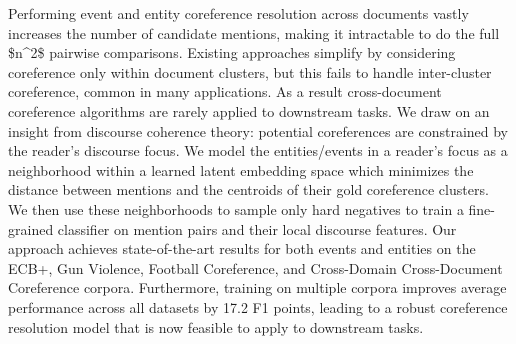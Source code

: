 Performing event and entity coreference resolution across documents vastly increases the number of candidate mentions, making it intractable to do the full \$n^2\$ pairwise comparisons. Existing approaches simplify by considering coreference only within document clusters, but this fails to handle inter-cluster coreference, common in many applications. As a result cross-document coreference algorithms are rarely applied to downstream tasks. We draw on an insight from discourse coherence theory: potential coreferences are constrained by the reader's discourse focus. We model the entities/events in a reader's focus as a neighborhood within a learned latent embedding space which minimizes the distance between mentions and the centroids of their gold coreference clusters. We then use these neighborhoods to sample only hard negatives to train a fine-grained classifier on mention pairs and their local discourse features. Our approach achieves state-of-the-art results for both events and entities on the ECB+, Gun Violence, Football Coreference, and Cross-Domain Cross-Document Coreference corpora. Furthermore, training on multiple corpora improves average performance across all datasets by 17.2 F1 points, leading to a robust coreference resolution model that is now feasible to apply to downstream tasks.
